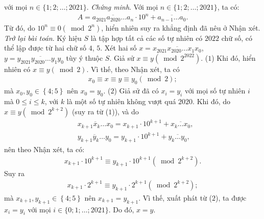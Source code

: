 \begin{multicols}{2}
	với mọi $n \in \{1; 2; \ldots; 2021\}$.
	\vskip 0.05cm
	\textit{Chứng minh}. Với mọi $n \in \{1; 2; \ldots; 2021\}$, ta có:
	\begin{align*}
		A = \overline {{a_{2021}}{a_{2020}} \ldots {a_n}}  \cdot {10^n} + \overline {{a_{n - 1}} \ldots {a_0}} .
	\end{align*}
	Từ đó, do  ${10^n} \equiv 0\left( {\bmod {2^n}} \right)$, hiển nhiên suy ra khẳng định đã nêu ở Nhận xét.
	\vskip 0.05cm
	\textit{Trở lại bài toán}.
	\vskip 0.05cm
	Ký hiệu $S$ là tập hợp tất cả các số tự nhiên có $2022$ chữ số, có thể lập được từ hai chữ số $4$, $5$.
	\vskip 0.05cm
	Xét hai số $x = \overline {{x_{2021}}{x_{2020}} \ldots {x_1}{x_0}} $,\linebreak $y = \overline {{y_{2021}}{y_{2020}} \ldots {y_1}{y_0}} $  tùy ý thuộc $S$.
	\vskip 0.05cm
	Giả sử $x \equiv y\left( {\bmod {2^{2022}}} \right)$. \hfill ($1$)
	\vskip 0.05cm
	Khi đó, hiển nhiên có $x \equiv y\left( {\bmod 2} \right)$.  Vì thế, theo Nhận xét, ta có
	\begin{align*}
		{x_0} \equiv x \equiv y \equiv {y_0}\left( {\bmod 2} \right);
	\end{align*}
	mà ${x_0},{y_0} \in \left\{ {4;5} \right\}$ nên $x_0 = y_0$. \hfill ($2$)
	\vskip 0.05cm         
	Giả sử đã có  ${x_i} = {y_i}$ với mọi số tự nhiên $i$ mà $0 \le i \le k$, với $k$ là một số tự nhiên không vượt quá $2020$. Khi đó, do \linebreak$x \equiv y\left( {\bmod {2^{k + 2}}} \right)$  (suy ra từ ($1$)), và do
	\begin{align*}
		&\overline {{x_{k + 1}}{x_k} \ldots {x_0}}  = {x_{k + 1}} \cdot {10^{k + 1}} + \overline {{x_k} \ldots {x_0}} ,\\
		&\overline {{y_{k + 1}}{y_k} \ldots {y_0}}  = {y_{k + 1}} \cdot {10^{k + 1}} + \overline {{y_k} \ldots {y_0}} ,
	\end{align*}
	nên theo Nhận xét, ta có:
	\begin{align*}
		{x_{k + 1}} \cdot {10^{k + 1}} \equiv {y_{k + 1}} \cdot {10^{k + 1}}\left( {\bmod {2^{k + 2}}} \right).
	\end{align*}
	Suy ra
	\begin{align*}
		{x_{k + 1}} \cdot {2^{k + 1}} \equiv {y_{k + 1}} \cdot {2^{k + 1}}\left( {\bmod {2^{k + 2}}} \right);
	\end{align*}
	mà ${x_{k + 1}},{y_{k + 1}} \in \left\{ {4;5} \right\}$ nên  ${x_{k + 1}} = {y_{k + 1}}$.
	\vskip 0.05cm
	Vì thế, xuất phát từ ($2$), ta được $x_i = y_i$  với mọi $i \in \{0; 1; \ldots; 2021\}$. Do đó, $x = y$.

\end{multicols}
